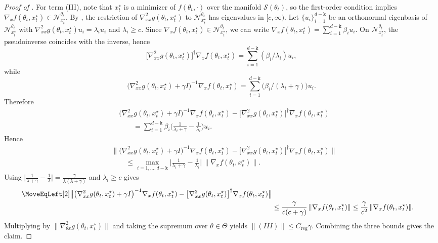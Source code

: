 \documentclass{article}
\theoremstyle{normaltheorem}
\newcommand{\dimk}{\texttt{k}}
\newcommand{\calS}{\mathcal{S}}
\newcommand{\calN}{\mathcal{N}}
\begin{document}
\begin{proof}[Proof of ]
	For term (III), note that $x_t^\star$ is a minimizer of $f(\theta_t,\cdot)$ over the manifold $\calS(\theta_t)$, so
	the first-order condition implies $\nabla_x f(\theta_t,x_t^\star)\in\calN_{x_t^\star}^{\theta_t}$.
	By , the restriction of $\nabla^2_{xx}g(\theta_t,x_t^\star)$ to $\calN_{x_t^\star}^{\theta_t}$ has
	eigenvalues in $[c,\infty)$.
		Let $\{u_i\}_{i=1}^{d-\dimk}$ be an orthonormal eigenbasis of $\calN_{x_t^\star}^{\theta_t}$ with
		$\nabla^2_{xx}g(\theta_t,x_t^\star)u_i=\lambda_i u_i$ and $\lambda_i\ge c$.
	Since $\nabla_x f(\theta_t,x_t^\star)\in\calN_{x_t^\star}^{\theta_t}$, we can write
	$\nabla_x f(\theta_t,x_t^\star)=\sum_{i=1}^{d-\dimk} \beta_i u_i$.
	On $\calN_{x_t^\star}^{\theta_t}$, the pseudoinverse coincides with the inverse, hence
	\[
	\big[\nabla^2_{xx}g(\theta_t,x_t^\star)\big]^\dagger \nabla_x f(\theta_t,x_t^\star)
	=
	\sum_{i=1}^{d-\dimk}(\beta_i/\lambda_i)u_i,
	\]
	while
	\[
	\big(\nabla^2_{xx}g(\theta_t,x_t^\star)+\gamma I\big)^{-1}\nabla_x f(\theta_t,x_t^\star)
	=
	\sum_{i=1}^{d-\dimk}\big(\beta_i/(\lambda_i+\gamma)\big)u_i.
	\]
		Therefore
		\[
		\begin{aligned}
		&\big(\nabla^2_{xx}g(\theta_t,x_t^\star)+\gamma I\big)^{-1}\nabla_x f(\theta_t,x_t^\star)
		-\big[\nabla^2_{xx}g(\theta_t,x_t^\star)\big]^\dagger\nabla_x f(\theta_t,x_t^\star)\\
		&\qquad =
		\sum_{i=1}^{d-\dimk} \beta_i\Big(\frac{1}{\lambda_i+\gamma}-\frac{1}{\lambda_i}\Big)u_i .
		\end{aligned}
		\]
		Hence
		\[
		\begin{aligned}
		&\big\|\big(\nabla^2_{xx}g(\theta_t,x_t^\star)+\gamma I\big)^{-1}\nabla_x f(\theta_t,x_t^\star)
		-\big[\nabla^2_{xx}g(\theta_t,x_t^\star)\big]^\dagger\nabla_x f(\theta_t,x_t^\star)\big\|\\
		&\qquad\le
		\max_{i=1,\dots,d-\dimk}\Big|\frac{1}{\lambda_i+\gamma}-\frac{1}{\lambda_i}\Big|\,
		\|\nabla_x f(\theta_t,x_t^\star)\|.
		\end{aligned}
		\]
	Using $\big|\frac{1}{\lambda+\gamma}-\frac{1}{\lambda}\big|=\frac{\gamma}{\lambda(\lambda+\gamma)}$ and $\lambda_i\ge c$ gives
	\begin{align*}
	\MoveEqLeft[2]\big\|\big(\nabla^2_{xx}g(\theta_t,x_t^\star)+\gamma I\big)^{-1}\nabla_x f(\theta_t,x_t^\star)
	-\big[\nabla^2_{xx}g(\theta_t,x_t^\star)\big]^\dagger\nabla_x f(\theta_t,x_t^\star)\big\|\\
	&\le \frac{\gamma}{c(c+\gamma)}\,\|\nabla_x f(\theta_t,x_t^\star)\|
	\le \frac{\gamma}{c^2}\,\|\nabla_x f(\theta_t,x_t^\star)\|.
	\end{align*}
	Multiplying by $\|\nabla^2_{\theta x}g(\theta_t,x_t^\star)\|$ and taking the supremum over $\theta\in\Theta$ yields
	$\|(III)\|\le C_{\mathrm{reg}}\gamma$.
	Combining the three bounds gives the claim.
	\end{proof}
\end{document}
